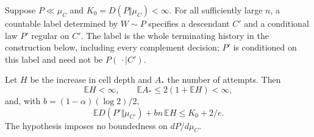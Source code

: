 \begin{lemma}
\label{l:finite-entropy:regularization}
Suppose \(P\ll\mu_C\) and \(K_0=D(P\Vert\mu_C)<\infty\).
For all sufficiently large \(n\), a countable label determined by
\(W\sim P\) specifies a descendant \(C'\) and a conditional law
\(P'\) regular on \(C'\).  The label is the whole terminating
history in the construction below, including every complement
decision; \(P'\) is conditioned on this label and need not be
\(P(\,\cdot\mid C')\).

Let \(H\) be the increase in cell depth and \(A_*\) the number of
attempts.  Then
\[
 \mathbb EH<\infty,\qquad
 \mathbb EA_*\le2(1+\mathbb EH)<\infty,
\]
and, with \(b=(1-\alpha)(\log2)/2\),
\begin{equation}\label{l:finite-entropy:budget}
 \mathbb E D(P'\Vert\mu_{C'})+bn\,\mathbb EH\le K_0+2/e.
\end{equation}
The hypothesis imposes no boundedness on \(dP/d\mu_C\).
\end{lemma}

